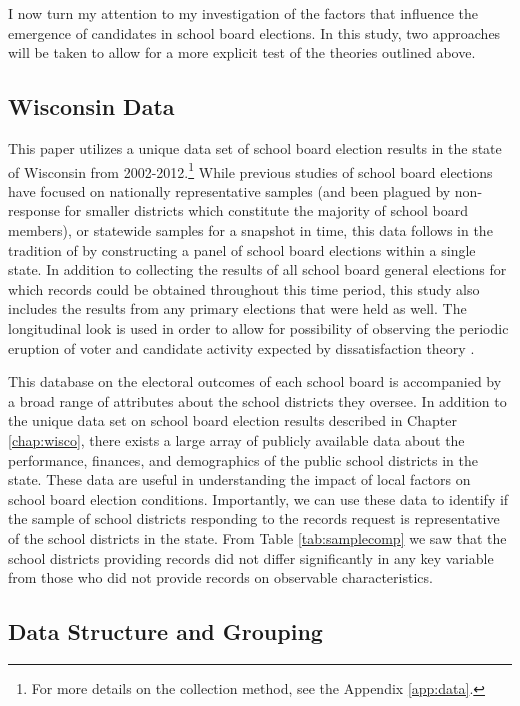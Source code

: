 I now turn my attention to my investigation of the factors that influence 
the emergence of candidates in school board elections. In this study, two 
approaches will be taken to allow for a more explicit test of the theories outlined 
above. 

\subsection{Wisconsin Data}

This paper utilizes a unique data set of school board election results in the state 
of Wisconsin from 2002-2012.\footnote{For more details on the collection method, 
see the Appendix \ref{app:data}.} While previous studies of school board elections have focused 
on nationally representative samples (and been plagued by non-response for smaller 
districts which constitute the majority of school board members), or statewide 
samples for a snapshot in time, this data follows in the 
tradition of \citet{RefWorks:311} by constructing a panel of school board elections 
within a single state. In addition to collecting the results of all school board 
general elections for which records could be obtained throughout this time period, 
this study also includes the results from any primary elections that were held 
as well. The longitudinal look is used in order to allow for possibility of 
observing the periodic eruption of voter and candidate activity expected by 
dissatisfaction theory \citep{RefWorks:297,RefWorks:271}. 

This database on the electoral outcomes of each school board is accompanied by 
a broad range of attributes about the school districts they oversee. In addition 
to the unique data set on school board election results described in 
Chapter \ref{chap:wisco}, there exists 
a large array of publicly available data about the performance, finances, 
and demographics of the public school districts in the state. These data are useful 
in understanding the impact of local factors on school board election conditions. 
Importantly, we can use these data to identify if the sample of school 
districts responding to the records request is representative of the school 
districts in the state. From Table \ref{tab:samplecomp} we saw 
that the school districts providing records did not differ significantly in any 
key variable from those who did not provide records on observable characteristics. 

\subsection{Data Structure and Grouping}

